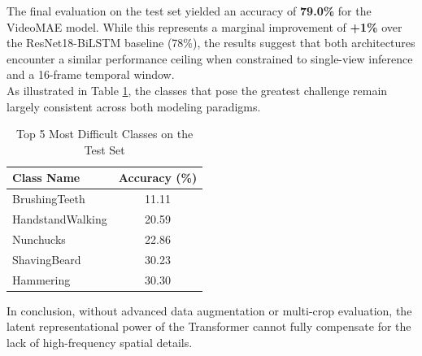 The final evaluation on the test set yielded an accuracy of \textbf{79.0\%} for the VideoMAE model. While this represents a marginal improvement of \textbf{+1\%} over the ResNet18-BiLSTM baseline (78\%), the results suggest that both architectures encounter a similar performance ceiling when constrained to single-view inference and a 16-frame temporal window. \\
As illustrated in Table \ref{tab:worst5_classes_final}, the classes that pose the greatest challenge remain largely consistent across both modeling paradigms. 

\begin{table}[h]
\centering
\caption{Top 5 Most Difficult Classes on the Test Set}
\label{tab:worst5_classes_final}
\begin{tabular}{l c}
\toprule
\textbf{Class Name} & \textbf{Accuracy (\%)} \\
\midrule
BrushingTeeth     & 11.11 \\
HandstandWalking  & 20.59 \\
Nunchucks         & 22.86 \\
ShavingBeard      & 30.23 \\
Hammering         & 30.30 \\
\bottomrule
\end{tabular}
\end{table}

\noindent
In conclusion, without advanced data augmentation or multi-crop evaluation, the latent representational power of the Transformer cannot fully compensate for the lack of high-frequency spatial details.